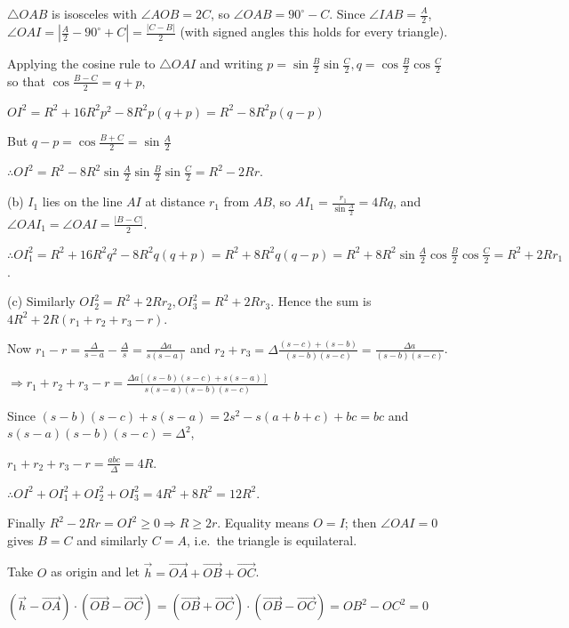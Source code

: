   $\triangle OAB$ is isosceles with $\angle AOB = 2C$, so $\angle OAB = 90^\circ - C$. Since $\angle IAB =
  \frac{A}{2}$, $\angle OAI = \left|\frac{A}{2} - 90^\circ + C\right| = \frac{|C - B|}{2}$ (with signed angles
  this holds for every triangle).

  Applying the cosine rule to $\triangle OAI$ and writing $p = \sin\frac{B}{2}\sin\frac{C}{2}, q =
  \cos\frac{B}{2}\cos\frac{C}{2}$ so that $\cos\frac{B - C}{2} = q + p$,

  $OI^2 = R^2 + 16R^2p^2 - 8R^2p(q + p) = R^2 - 8R^2p(q - p)$

  But $q - p = \cos\frac{B + C}{2} = \sin\frac{A}{2}$

  $\therefore OI^2 = R^2 - 8R^2\sin\frac{A}{2}\sin\frac{B}{2}\sin\frac{C}{2} = R^2 - 2Rr$.

  (b) $I_1$ lies on the line $AI$ at distance $r_1$ from $AB$, so $AI_1 = \frac{r_1}{\sin\frac{A}{2}} =
  4Rq$, and $\angle OAI_1 = \angle OAI = \frac{|B - C|}{2}$.

  $\therefore OI_1^2 = R^2 + 16R^2q^2 - 8R^2q(q + p) = R^2 + 8R^2q(q - p) = R^2 +
  8R^2\sin\frac{A}{2}\cos\frac{B}{2}\cos\frac{C}{2} = R^2 + 2Rr_1$.

  (c) Similarly $OI_2^2 = R^2 + 2Rr_2, OI_3^2 = R^2 + 2Rr_3$. Hence the sum is $4R^2 + 2R(r_1 + r_2 + r_3 -
  r)$.

  Now $r_1 - r = \frac{\Delta}{s - a} - \frac{\Delta}{s} = \frac{\Delta a}{s(s - a)}$ and $r_2 + r_3 =
  \Delta\frac{(s - c) + (s - b)}{(s - b)(s - c)} = \frac{\Delta a}{(s - b)(s - c)}$.

  $\Rightarrow r_1 + r_2 + r_3 - r = \frac{\Delta a[(s - b)(s - c) + s(s - a)]}{s(s - a)(s - b)(s - c)}$

  Since $(s - b)(s - c) + s(s - a) = 2s^2 - s(a + b + c) + bc = bc$ and $s(s - a)(s - b)(s - c) = \Delta^2$,

  $r_1 + r_2 + r_3 - r = \frac{abc}{\Delta} = 4R$.

  $\therefore OI^2 + OI_1^2 + OI_2^2 + OI_3^2 = 4R^2 + 8R^2 = 12R^2$.

  Finally $R^2 - 2Rr = OI^2 \geq 0 \Rightarrow R\geq 2r$. Equality means $O = I$; then $\angle OAI = 0$ gives
  $B = C$ and similarly $C = A$, i.e.\ the triangle is equilateral.
\item Take $O$ as origin and let $\vec{h} = \vec{OA} + \vec{OB} + \vec{OC}$.

  $(\vec{h} - \vec{OA})\cdot(\vec{OB} - \vec{OC}) = (\vec{OB} + \vec{OC})\cdot(\vec{OB} - \vec{OC}) = OB^2 -
  OC^2 = 0$

